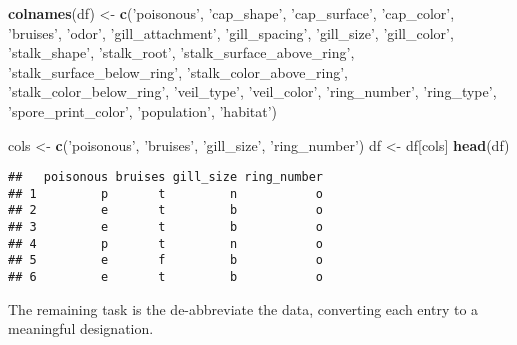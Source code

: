 \documentclass[11pt,]{article}
\newenvironment{Shaded}{\begin{snugshade}}{\end{snugshade}}
\newcommand{\KeywordTok}[1]{\textcolor[rgb]{0.13,0.29,0.53}{\textbf{#1}}}
\newcommand{\NormalTok}[1]{#1}
\newcommand{\StringTok}[1]{\textcolor[rgb]{0.31,0.60,0.02}{#1}}
\begin{document}
\begin{Shaded}
\begin{Highlighting}[]
\KeywordTok{colnames}\NormalTok{(df) <-}\StringTok{ }\KeywordTok{c}\NormalTok{(}\StringTok{'poisonous'}\NormalTok{,}
                  \StringTok{'cap_shape'}\NormalTok{, }
                  \StringTok{'cap_surface'}\NormalTok{, }
                  \StringTok{'cap_color'}\NormalTok{, }
                  \StringTok{'bruises'}\NormalTok{, }
                  \StringTok{'odor'}\NormalTok{, }
                  \StringTok{'gill_attachment'}\NormalTok{, }
                  \StringTok{'gill_spacing'}\NormalTok{, }
                  \StringTok{'gill_size'}\NormalTok{, }
                  \StringTok{'gill_color'}\NormalTok{, }
                  \StringTok{'stalk_shape'}\NormalTok{, }
                  \StringTok{'stalk_root'}\NormalTok{, }
                  \StringTok{'stalk_surface_above_ring'}\NormalTok{, }
                  \StringTok{'stalk_surface_below_ring'}\NormalTok{, }
                  \StringTok{'stalk_color_above_ring'}\NormalTok{, }
                  \StringTok{'stalk_color_below_ring'}\NormalTok{, }
                  \StringTok{'veil_type'}\NormalTok{, }
                  \StringTok{'veil_color'}\NormalTok{, }
                  \StringTok{'ring_number'}\NormalTok{, }
                  \StringTok{'ring_type'}\NormalTok{, }
                  \StringTok{'spore_print_color'}\NormalTok{, }
                  \StringTok{'population'}\NormalTok{, }
                  \StringTok{'habitat'}\NormalTok{)}

\NormalTok{cols <-}\StringTok{ }\KeywordTok{c}\NormalTok{(}\StringTok{'poisonous'}\NormalTok{, }\StringTok{'bruises'}\NormalTok{, }\StringTok{'gill_size'}\NormalTok{, }\StringTok{'ring_number'}\NormalTok{)}
\NormalTok{df <-}\StringTok{ }\NormalTok{df[cols]}
\KeywordTok{head}\NormalTok{(df)}
\end{Highlighting}
\end{Shaded}

\begin{verbatim}
##   poisonous bruises gill_size ring_number
## 1         p       t         n           o
## 2         e       t         b           o
## 3         e       t         b           o
## 4         p       t         n           o
## 5         e       f         b           o
## 6         e       t         b           o
\end{verbatim}

The remaining task is the de-abbreviate the data, converting each entry
to a meaningful designation.
\end{document}
